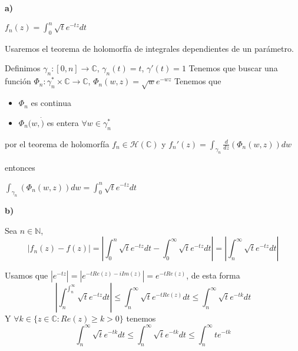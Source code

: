 \begin{sol}

\textbf{a)}

$f_n(z) = \int_0^n \sqrt{t}e^{-tz}dt$

Usaremos el teorema de holomorfía de integrales dependientes de un parámetro.

Definimos
$\gamma_n :[0,n] \rightarrow \mathbb{C}$, $\gamma_n(t)=t$, $\gamma'(t) = 1$
Tenemos que buscar una función $\Phi_n : \gamma_n^{\ast}\times\mathbb{C} \rightarrow \mathbb{C}$, $\Phi_n(w,z) = \sqrt{w}e^{-wz}$
Tenemos que
\begin{itemize}
	\item $\Phi_n$ es continua
	\item $\Phi_n(w,\dot)$ es entera $\forall w\in\gamma_n^{\ast}$
\end{itemize}

por el teorema de holomorfía
$f_n \in\mathcal{H}(\mathbb{C})$ y $f_n'(z) = \int_{\gamma_n} \frac{d}{dz} (\Phi_n(w,z)) dw$

entonces

$\int_{\gamma_n}(\Phi_n(w,z)) dw = \int_0^n \sqrt{t}e^{-tz} dt$


\textbf{b)}

Sea $n\in\mathbb{N}$,
$$|f_n(z) - f(z)| = |\int_{0}^{n} \sqrt{t} e^{-tz}dt - \int_{0}^{\infty} \sqrt{t}e^{-tz}dt| = |\int_{n}^{\infty} \sqrt{t} e^{-tz}dt|$$

Usamos que 
$|e^{-tz}| = |e^{-tRe(z)-iIm(z)}| = e^{-tRe(z)}$, de esta forma
$$|\int_{n}^{\int_n^{\infty}} \sqrt{t} e^{-tz}dt| \leq \int_{n}^{\infty} \sqrt{t}e^{-tRe(z)} dt \leq \int_{n}^{\infty} \sqrt{t}e^{-tk}dt $$
Y $\forall k\in \{ z\in\mathbb{C} : Re(z)\geq k > 0 \}$ tenemos
$$\int_{n}^{\infty} \sqrt{t}e^{-tk}dt \leq \int_{n}^{\infty} \sqrt{t}e^{-tk} dt \leq \int_{n}^{\infty} te^{-tk}$$
\end{sol}

